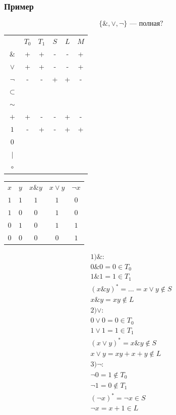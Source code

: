 \documentclass{article}
\begin{document}
\subsubsection{Пример}
\[
    \{\&, \vee, \neg\} \text{ --- полная?}
\]
\begin{tabular}{c|c|c|c|c|c}
    ~         & $T_0$ & $T_1$ & $S$ & $L$ & $M$ \\
    $\&$      &   +   &   +   &  -  &  -  &  +  \\
    $\vee$    &   +   &   +   &  -  &  -  &  +  \\
    $\neg$    &   -   &   -   &  +  &  +  &  -  \\
    $\subset$ &       &       &     &     &     \\
    $\sim$    &       &       &     &     &     \\
    $+$       &   +   &   -   &  -  &  +  &  -  \\
    $1$       &   -   &   +   &  -  &  +  &  +  \\
    $0$       &       &       &     &     &     \\
    $|$       &       &       &     &     &     \\
    $\circ$   &       &       &     &     &     
\end{tabular}
\begin{tabular}{c|c|c|c|c}
    $x$ & $y$ & $x \& y$ & $x \vee y$ & $\neg x$ \\
    $1$ & $1$ & $1$      & $1$        & $0$      \\
    $1$ & $0$ & $0$      & $1$        & $0$      \\
    $0$ & $1$ & $0$      & $1$        & $1$      \\
    $0$ & $0$ & $0$      & $0$        & $1$      
\end{tabular}
\begin{gather*}
    1) \&: \\ 
    0 \& 0 = 0 \in T_0 \\
    1 \& 1 = 1 \in T_1 \\
    (x \& y)^* = \dots = x \vee y \notin S \\
    x \& y = xy \notin L \\
    2) \vee: \\
    0 \vee 0 = 0 \in T_0 \\
    1 \vee 1 = 1 \in T_1 \\
    (x \vee y)^* = x \& y \notin S \\
    x \vee y = xy + x + y \notin L \\
    3) \neg: \\
    \neg 0 = 1 \notin T_0 \\
    \neg 1 = 0 \notin T_1 \\
    (\neg x)^* = \neg x \in S \\
    \neg x = x + 1 \in L
\end{gather*}
\end{document}
